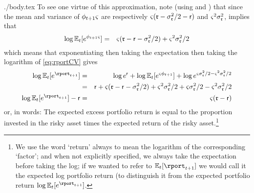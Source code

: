 \documentclass{bejournal}
\begin{document}
\begin{verbatimwrite}{./body.tex}
To see one virtue of this approximation, note (using  and ) that since the mean and variance of $\phi_{t+1} {\varsigma}$ are respectively ${\varsigma}(\mathfrak{r} - \sigma^{2}_{\mathfrak{r}}/2- \mathsf{r})$ and ${\varsigma}^{2} \sigma^{2}_{\mathfrak{r}}$,  implies that  
\begin{eqnarray}
 \log \mathbb{E}_{t}[e^{\phi_{t+1} {\varsigma}}] & = & {\varsigma} (\mathfrak{r} - \mathsf{r} - \sigma^{2}_{\mathfrak{r}}/2) + {\varsigma}^{2}\sigma^{2}_{\mathfrak{r}}/2 
\end{eqnarray}
which means that exponentiating then taking the expectation then taking the logarithm of \eqref{eq:rportCV} gives 
\begin{eqnarray}
   \log \Ex_{t}[e^{\rport_{t+1}}] & = & \log e^{\rfree} + \log \Ex_{t}[e^{\riskyshare \eprem_{t+1}}] + \log e^{\riskyshare\sigma^{2}_{\risky}/2 - \riskyshare^{2}\sigma^{2}_{\risky}/2}
\\ & = & 
\rfree + \riskyshare (\risky-\rfree-\sigma^{2}_{\risky}/2)+\riskyshare^{2}\sigma^{2}_{\risky}/2 +\riskyshare \sigma^{2}_{\risky}/2 - \riskyshare^{2}\sigma^{2}_{\risky}/2 
\\ \log \Ex_{t}[e^{\rport_{t+1}}] - \rfree & = &  \riskyshare (\risky-\rfree) \label{eq:rportDist}
\end{eqnarray}
or, in words: The expected excess portfolio return is equal to the proportion invested in the risky asset times the expected return of the risky asset.\footnote{We use the word `return' always to mean the logarithm of the corresponding `factor'; and when not explicitly specified, we always take the expectation before taking the log; if we wanted to refer to $\Ex_{t}[\rport_{t+1}]$ we would call it the expected log portfolio return (to distinguish it from the expected portfolio return $\log \Ex_{t}[e^{\rport_{t+1}}]$.}


\end{verbatimwrite}
\end{document}
